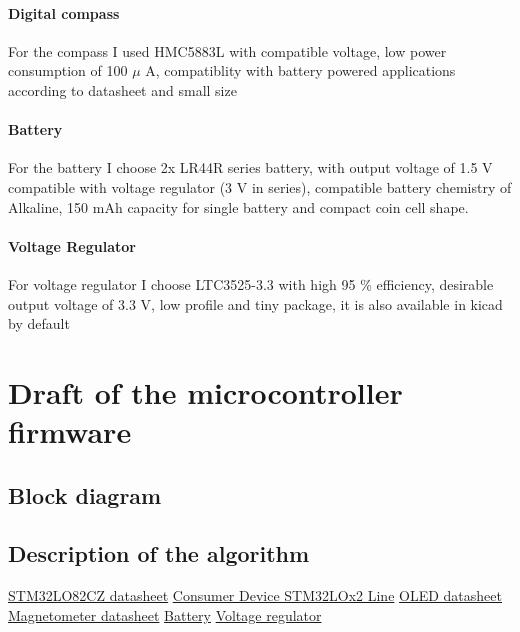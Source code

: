 \documentclass{article}
\begin{document}
\paragraph{Digital compass} For the compass I used HMC5883L with compatible
voltage, low power consumption of 100 $\mu$ A, compatiblity with battery powered
applications according to datasheet and small size 
\paragraph{Battery} For the battery I choose 2x LR44R series battery, with output
voltage of 1.5 V compatible with voltage regulator (3 V in series), compatible
battery chemistry of Alkaline, 150 mAh capacity for single battery and compact
coin cell shape. \cite{Battery}
\paragraph{Voltage Regulator} For voltage regulator I choose LTC3525-3.3 with high 95 \%
efficiency, desirable output voltage of 3.3 V, low profile and tiny package, it
is also available in kicad by default \cite{Voltage Regulator}
\section{Draft of the microcontroller firmware}
\subsection{Block diagram}
\subsection{Description of the algorithm}
\begin{thebibliography}{9}
	\href{https://www.st.com/resource/en/datasheet/stm32l082cz.pdf}{STM32LO82CZ
	datasheet}
	\href{https://www.st.com/en/microcontrollers-microprocessors/stm32l0-series.html}{Consumer
	Device STM32LOx2 Line}
	\href{https://www.mouser.pl/datasheet/2/291/NHD_2_7_12864WDY3-1116258.pdf}{OLED
	datasheet}
	\href{https://cdn-shop.adafruit.com/datasheets/HMC5883L_3-Axis_Digital_Compass_IC.pdf}{Magnetometer
	datasheet}
	\href{https://www.murata.com/products/productdata/8809693839390/LR44R-DATASHEET.pdf?1604287808000}{Battery}
	\href{https://www.analog.com/media/en/technical-documentation/data-sheets/3525fc.pdf}{Voltage
	regulator} 
\end{thebibliography}
\end{document}
